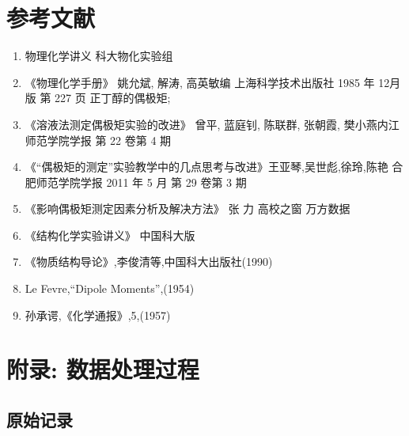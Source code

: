 \documentclass[11pt]{report}
\begin{document}
\part{参考文献}
\label{sec:orgb8c8dea}
\begin{enumerate}
\item 物理化学讲义 科大物化实验组
\item 《物理化学手册》 姚允斌, 解涛, 高英敏编 上海科学技术出版社 1985 年 12月版 第 227 页 正丁醇的偶极矩;
\item 《溶液法测定偶极矩实验的改进》 曾平, 蓝庭钊, 陈联群, 张朝霞, 樊小燕内江师范学院学报 第 22 卷第 4 期
\item 《“偶极矩的测定”实验教学中的几点思考与改进》王亚琴,吴世彪,徐玲,陈艳 合肥师范学院学报 2011 年 5 月 第 29 卷第 3 期
\item 《影响偶极矩测定因素分析及解决方法》 张 力 高校之窗 万方数据
\item 《结构化学实验讲义》 中国科大版
\item 《物质结构导论》,李俊清等,中国科大出版社(1990)
\item Le Fevre,“Dipole Moments”,(1954)
\item 孙承谔,《化学通报》,5,(1957)
\end{enumerate}

\part{附录: 数据处理过程}
\label{sec:org3b4cc4d}
\chapter{原始记录}
\label{sec:orga0c0d42}
\end{document}
